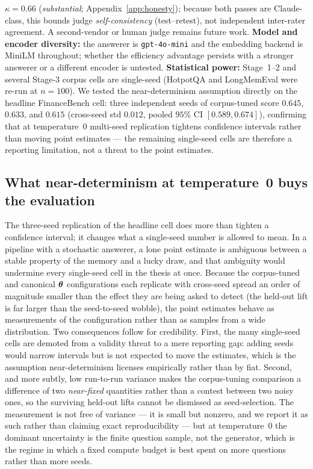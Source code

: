 $\kappa = 0.66$ (\emph{substantial}; Appendix~\ref{app:honesty}); because both
passes are Claude-class, this bounds judge \emph{self-consistency} (test--retest),
not independent inter-rater agreement. A second-vendor or human judge remains
future work.
\textbf{Model and encoder diversity:} the answerer is \texttt{gpt-4o-mini} and
the embedding backend is MiniLM throughout; whether the efficiency advantage
persists with a stronger answerer or a different encoder is untested.
\textbf{Statistical power:} Stage~1--2 and several Stage-3 corpus cells are
single-seed (HotpotQA and LongMemEval were re-run at $n{=}100$). We tested the
near-determinism assumption directly on the headline FinanceBench cell: three
independent seeds of corpus-tuned \Vt{} score $0.645$, $0.633$, and $0.615$
(cross-seed std $0.012$, pooled $95\%$ CI $[0.589, 0.674]$), confirming that at
temperature~0 multi-seed replication tightens confidence intervals rather than
moving point estimates --- the remaining single-seed cells are therefore a
reporting limitation, not a threat to the point estimates.

\subsection{What near-determinism at temperature~0 buys the evaluation}
\label{sec:determinism}
The three-seed replication of the headline \FB{} cell does more than tighten a
confidence interval; it changes what a single-seed number is allowed to mean. In
a pipeline with a stochastic answerer, a lone point estimate is ambiguous between
a stable property of the memory and a lucky draw, and that ambiguity would
undermine every single-seed cell in the thesis at once. Because the corpus-tuned
and canonical $\boldsymbol{\theta}$ configurations each replicate with cross-seed spread an
order of magnitude smaller than the effect they are being asked to detect (the
held-out \FB{} lift is far larger than the seed-to-seed wobble), the point
estimates behave as measurements of the configuration rather than as samples from
a wide distribution. Two consequences follow for credibility. First, the many
single-seed cells are demoted from a validity threat to a mere reporting gap:
adding seeds would narrow intervals but is not expected to move the estimates,
which is the assumption near-determinism licenses empirically rather than by
fiat. Second, and more subtly, low run-to-run variance makes the corpus-tuning
comparison a difference of two \emph{near-fixed} quantities rather than a contest
between two noisy ones, so the surviving held-out lifts cannot be dismissed as
seed-selection. The measurement is not free of variance --- it is small but
nonzero, and we report it as such rather than claiming exact reproducibility ---
but at temperature~0 the dominant uncertainty is the finite question sample, not
the generator, which is the regime in which a fixed compute budget is best spent
on more questions rather than more seeds.

